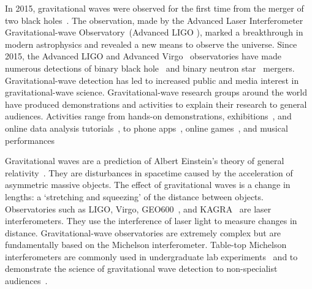 \documentclass[paper-main.tex]{subfiles}
\begin{document}
In 2015, gravitational waves were observed for the first time from the merger of two black holes~\cite{GW150914}. 
The observation, made by the Advanced Laser Interferometer Gravitational-wave Observatory~(Advanced LIGO \citep{AdvancedLIGO:2015}), marked a breakthrough in modern astrophysics and revealed a new means to observe the universe. 
Since 2015, the Advanced LIGO and Advanced Virgo~\cite{AdvancedVirgo:2015} observatories have made numerous detections of binary black hole~\cite{GW151226,GW170104,GW170814} and binary neutron star~\cite{GW170817,GW170817multi,GW190425} mergers. 
Gravitational-wave detection has led to increased public and media interest in gravitational-wave science. 
Gravitational-wave research groups around the world have produced demonstrations and activities to explain their research to general audiences. 
Activities range from hands-on demonstrations, exhibitions~\cite{TTExhibit:2020,LIGOScienceEducationCentre:online,GravityDiscoveryCentre:online}, and online data analysis tutorials~\cite{GWOSC:online,LOSC:2015}, to phone apps~\cite{LaserLabs:online,SciVR:online,chirp:online}, online games~\cite{BlackHoleHunter:online}, and musical performances~\cite{ArthurJeffesMusic:online,GravitySynthLeonTrimble:online}%

Gravitational waves are a prediction of Albert Einstein's theory of general relativity~\cite{Einstein:1916}. 
They are disturbances in spacetime caused by the acceleration of asymmetric massive objects. 
The effect of gravitational waves is a change in lengths: a `stretching and squeezing' of the distance between objects.
Observatories such as LIGO, Virgo, GEO600~\cite{GEO600:2010}, and KAGRA~\cite{KAGRA:2013} are laser interferometers.
They use the interference of laser light to measure changes in distance. 
Gravitational-wave observatories are extremely complex but are fundamentally based on the Michelson interferometer. 
Table-top Michelson interferometers are commonly used in undergraduate lab experiments~\cite{UgoliniEtAl:2019} and to demonstrate the science of gravitational wave detection to non-specialist audiences~\cite{ThorLabsIFO,NikhefIFO,AMIGO:online,TTExhibit:2020,LIGOIFOGlue,LIGOIFOMagnets}.
\end{document}
